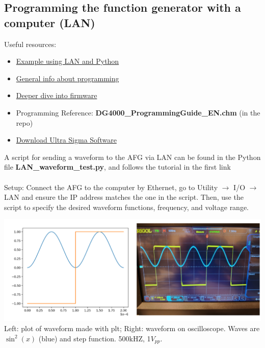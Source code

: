 \documentclass{article}
\begin{document}
    \subsection*{Programming the function generator with a computer (LAN)}
    Useful resources:
    \begin{itemize}
    \item \href{https://acidbourbon.wordpress.com/2019/09/12/send-numpy-data-to-rigol-dg4202-arbitrary-waveform-generator-via-lan/}{Example using LAN and Python}
    \item \href{https://www.eevblog.com/forum/testgear/dg4000dg4162-scpi-arbitrary-waveform-programming/}{General info about programming}
    \item \href{https://www.eevblog.com/forum/testgear/dg4000-a-firmware-investigation/}{Deeper dive into firmware}
    \item Programming Reference: \textbf{DG4000\_ProgrammingGuide\_EN.chm} (in the repo)
    \item \href{https://download.rigol.com/cn/Software/UltraSigma.zip}{Download Ultra Sigma Software}
    \end{itemize}
    A script for sending a waveform to the AFG via LAN can be found in the Python file \textbf{LAN\_waveform\_test.py}, and follows the tutorial in the first link\\\\
    Setup: Connect the AFG to the computer by Ethernet, go to Utility $\to$ I/O $\to$ LAN and ensure the IP address matches the one in the script. Then, use the script to specify the desired waveform functions, frequency, and voltage range.
    \begin{mdframed}[backgroundcolor=gray!20, align = center, userdefinedwidth = 5.8in]
    \includegraphics[width = 5.5in]{img/LAN_signal.png}
    \\Left: plot of waveform made with plt; Right: waveform on oscilloscope. Waves are $\sin^2(x)$ (blue) and step function. 500kHZ, 1$V_{pp}$.
    \end{mdframed}
\end{document}
